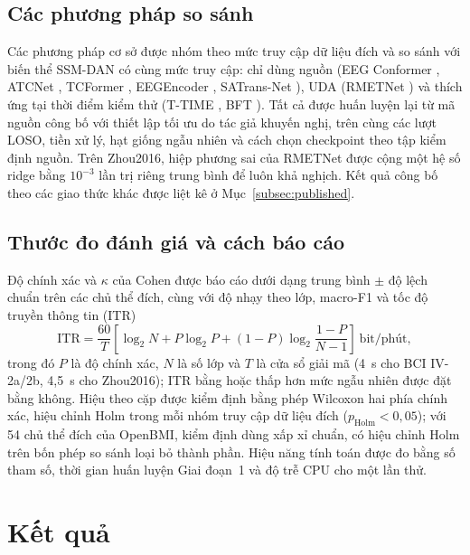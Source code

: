 \documentclass[preprint,12pt]{elsarticle}
\begin{document}
\subsection{Các phương pháp so sánh}
\label{subsec:baselines}

Các phương pháp cơ sở được nhóm theo mức truy cập dữ liệu đích và so sánh với biến thể SSM-DAN có cùng mức truy cập: chỉ dùng nguồn (EEG Conformer \cite{song2023eegconformer}, ATCNet \cite{altaheri2023atcnet}, TCFormer \cite{altaheri2025tcformer}, EEGEncoder \cite{liao2025eegencoder}, SATrans-Net \cite{miao2025satransnet}), UDA (RMETNet \cite{zhao2026rmetnet}) và thích ứng tại thời điểm kiểm thử (T-TIME \cite{li2024ttime}, BFT \cite{li2026bft}). Tất cả được huấn luyện lại từ mã nguồn công bố với thiết lập tối ưu do tác giả khuyến nghị, trên cùng các lượt LOSO, tiền xử lý, hạt giống ngẫu nhiên và cách chọn checkpoint theo tập kiểm định nguồn. Trên Zhou2016, hiệp phương sai của RMETNet được cộng một hệ số ridge bằng $10^{-3}$ lần trị riêng trung bình để luôn khả nghịch. Kết quả công bố theo các giao thức khác được liệt kê ở Mục~\ref{subsec:published}.

\subsection{Thước đo đánh giá và cách báo cáo}
\label{subsec:metrics}

Độ chính xác và $\kappa$ của Cohen được báo cáo dưới dạng trung bình $\pm$ độ lệch chuẩn trên các chủ thể đích, cùng với độ nhạy theo lớp, macro-F1 và tốc độ truyền thông tin (ITR) \cite{wolpaw2002bci}
\begin{equation}
\mathrm{ITR}=\frac{60}{T}\left[\log_2 N+P\log_2 P+(1-P)\log_2\frac{1-P}{N-1}\right]\ \text{bit/phút},
\label{eq:itr}
\end{equation}
trong đó $P$ là độ chính xác, $N$ là số lớp và $T$ là cửa sổ giải mã (4~s cho BCI IV-2a/2b, 4,5~s cho Zhou2016); ITR bằng hoặc thấp hơn mức ngẫu nhiên được đặt bằng không. Hiệu theo cặp được kiểm định bằng phép Wilcoxon hai phía chính xác, hiệu chỉnh Holm trong mỗi nhóm truy cập dữ liệu đích ($p_\mathrm{Holm}<0,05$); với 54 chủ thể đích của OpenBMI, kiểm định dùng xấp xỉ chuẩn, có hiệu chỉnh Holm trên bốn phép so sánh loại bỏ thành phần. Hiệu năng tính toán được đo bằng số tham số, thời gian huấn luyện Giai đoạn~1 và độ trễ CPU cho một lần thử.

\section{Kết quả}
\label{sec:results}
\end{document}
